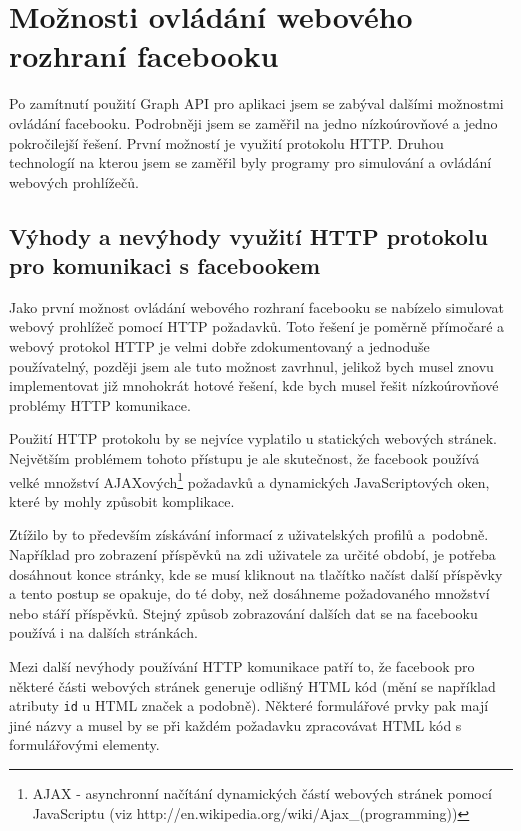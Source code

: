 \documentclass[thesis=M,czech]{FITthesis}[2013/05/10]
\begin{document}
\section{Možnosti ovládání webového rozhraní facebooku}

Po zamítnutí použití Graph API pro aplikaci jsem se zabýval dalšími možnostmi ovládání facebooku. Podrobněji jsem se zaměřil na jedno nízkoúrovňové a jedno pokročilejší řešení. První možností je využití protokolu HTTP. Druhou technologíí na kterou jsem se zaměřil byly programy pro simulování a ovládání webových prohlížečů.

\subsection{Výhody a nevýhody využití HTTP protokolu pro komunikaci s facebookem}

Jako první možnost ovládání webového rozhraní facebooku se nabízelo simulovat webový prohlížeč pomocí HTTP požadavků. Toto řešení je poměrně přímočaré a webový protokol HTTP je velmi dobře zdokumentovaný a jednoduše používatelný, později jsem ale tuto možnost zavrhnul, jelikož bych musel znovu implementovat již mnohokrát hotové řešení, kde bych musel řešit nízkoúrovňové problémy HTTP komunikace. 

Použití HTTP protokolu by se nejvíce vyplatilo u statických webových stránek. Největším problémem tohoto přístupu je ale skutečnost, že facebook používá velké množství AJAXových\footnote{AJAX - asynchronní načítání dynamických částí webových stránek pomocí JavaScriptu (viz http://en.wikipedia.org/wiki/Ajax\_(programming))} požadavků a dynamických JavaScriptových oken, které by mohly způsobit komplikace. 

Ztížilo by to především získávání informací z uživatelských profilů a~podobně. Například pro zobrazení příspěvků na zdi uživatele za určité období, je potřeba dosáhnout konce stránky, kde se musí kliknout na tlačítko načíst další příspěvky a tento postup se opakuje, do té doby, než dosáhneme požadovaného množství nebo stáří příspěvků. Stejný způsob zobrazování dalších dat se na facebooku používá i na dalších stránkách.

Mezi další nevýhody používání HTTP komunikace patří to, že facebook pro některé části webových stránek generuje odlišný HTML kód (mění se například atributy \verb|id| u HTML značek a podobně). Některé formulářové prvky pak mají jiné názvy a musel by se při každém požadavku zpracovávat HTML kód s formulářovými elementy. 
\end{document}
